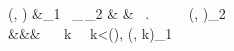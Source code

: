 (\history, \timepoint) &\models \mtl_1 \, _\interval \,\mtl_2  & &~  \m{\exists\,\distance}.~ \distance\,{\in}\,\interval  ~ ~ (\history, \timepoint\plus\distance)\models\mtl_2 ~ 
\\[0.1em] 
&&& ~ 
\m{\forall}\, 
k~ ~\timepoint{<}k{<}(\timepoint\plus\distance), 
(\history, k)\models \mtl_1
\\[0.1em]
